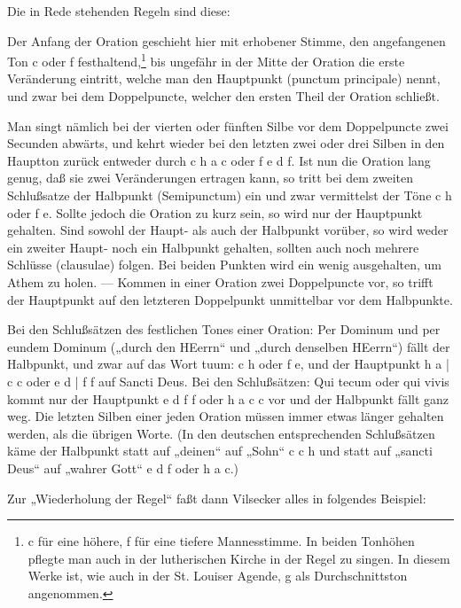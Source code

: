 Die in Rede stehenden Regeln sind diese:

Der Anfang der Oration geschieht hier mit erhobener Stimme, den angefangenen Ton c oder f festhaltend,\footnote{c für eine höhere, f für eine tiefere Mannesstimme. In beiden Tonhöhen pflegte man auch in der lutherischen Kirche in der Regel zu singen. In diesem Werke ist, wie auch in der St. Louiser Agende, g als Durchschnittston angenommen.} bis ungefähr in der Mitte der Oration
die erste Veränderung eintritt, welche man den Hauptpunkt (punctum principale) nennt, und zwar bei dem Doppelpuncte, welcher den ersten Theil der Oration schließt.

Man singt nämlich bei der vierten oder fünften Silbe vor dem Doppelpuncte zwei Secunden abwärts, und kehrt wieder bei den letzten zwei oder drei Silben in den Hauptton zurück entweder durch c h a c oder f e d f. Ist nun die Oration lang genug, daß sie zwei Veränderungen ertragen kann, so tritt bei dem zweiten Schlußsatze der Halbpunkt (Semipunctum) ein und zwar vermittelst der Töne c h oder f e. Sollte jedoch die Oration zu kurz sein, so wird nur der Hauptpunkt gehalten. Sind sowohl der Haupt- als auch der Halbpunkt vorüber, so wird weder ein zweiter Haupt- noch ein Halbpunkt gehalten, sollten auch noch mehrere Schlüsse (clausulae) folgen. Bei beiden Punkten wird ein wenig ausgehalten, um Athem zu holen. — Kommen in einer Oration zwei Doppelpuncte vor, so trifft der Hauptpunkt auf den letzteren Doppelpunkt unmittelbar vor dem Halbpunkte.

Bei den Schlußsätzen des festlichen Tones einer Oration: Per Dominum und per eundem Dominum („durch den HEerrn“ und „durch denselben HEerrn“) fällt der Halbpunkt, und zwar auf das Wort tuum: c h oder f e, und der Hauptpunkt h a | c c oder e d | f f auf Sancti Deus. Bei den Schlußsätzen: Qui tecum oder qui vivis kommt nur der Hauptpunkt e d f f oder h a c c vor und der Halbpunkt fällt ganz weg. Die letzten Silben einer jeden Oration müssen immer etwas länger gehalten werden, als die übrigen Worte. (In den deutschen entsprechenden Schlußsätzen käme der Halbpunkt statt auf „deinen“ auf „Sohn“ c c h und statt auf „sancti Deus“ auf „wahrer Gott“ e d f oder h a c.)

Zur „Wiederholung der Regel“ faßt dann Vilsecker alles in folgendes Beispiel:



